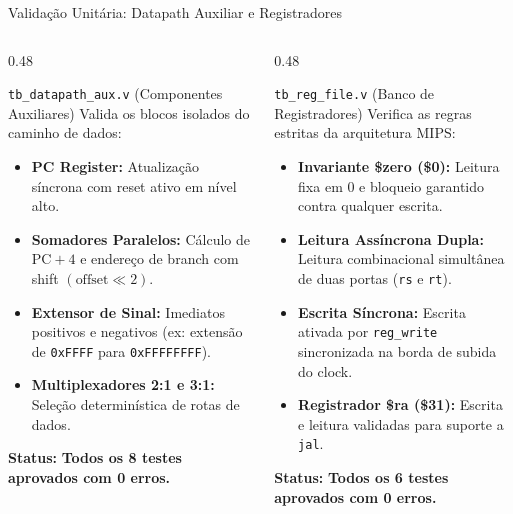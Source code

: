 \documentclass[aspectratio=169, 11pt]{beamer}
\begin{document}
\begin{frame}{Validação Unitária: Datapath Auxiliar e Registradores}
  \begin{columns}[T]
    \begin{column}{0.48\textwidth}
      \begin{block}{\texttt{tb\_datapath\_aux.v} (Componentes Auxiliares)}
        \small
        Valida os blocos isolados do caminho de dados:
        \begin{itemize}\setlength{\itemsep}{4pt}
          \item \textbf{PC Register:} Atualização síncrona com reset ativo em nível alto.
          \item \textbf{Somadores Paralelos:} Cálculo de $\text{PC}+4$ e endereço de branch com shift $(\text{offset} \ll 2)$.
          \item \textbf{Extensor de Sinal:} Imediatos positivos e negativos (ex: extensão de \texttt{0xFFFF} para \texttt{0xFFFFFFFF}).
          \item \textbf{Multiplexadores 2:1 e 3:1:} Seleção determinística de rotas de dados.
        \end{itemize}
        \textbf{Status:} \textcolor{passgreen}{\textbf{Todos os 8 testes aprovados com 0 erros.}}
      \end{block}
    \end{column}

    \begin{column}{0.48\textwidth}
      \begin{block}{\texttt{tb\_reg\_file.v} (Banco de Registradores)}
        \small
        Verifica as regras estritas da arquitetura MIPS:
        \begin{itemize}\setlength{\itemsep}{4pt}
          \item \textbf{Invariante \$zero (\$0):} Leitura fixa em 0 e bloqueio garantido contra qualquer escrita.
          \item \textbf{Leitura Assíncrona Dupla:} Leitura combinacional simultânea de duas portas (\texttt{rs} e \texttt{rt}).
          \item \textbf{Escrita Síncrona:} Escrita ativada por \texttt{reg\_write} sincronizada na borda de subida do clock.
          \item \textbf{Registrador \$ra (\$31):} Escrita e leitura validadas para suporte a \texttt{jal}.
        \end{itemize}
        \textbf{Status:} \textcolor{passgreen}{\textbf{Todos os 6 testes aprovados com 0 erros.}}
      \end{block}
    \end{column}
  \end{columns}
\end{frame}
\end{document}
